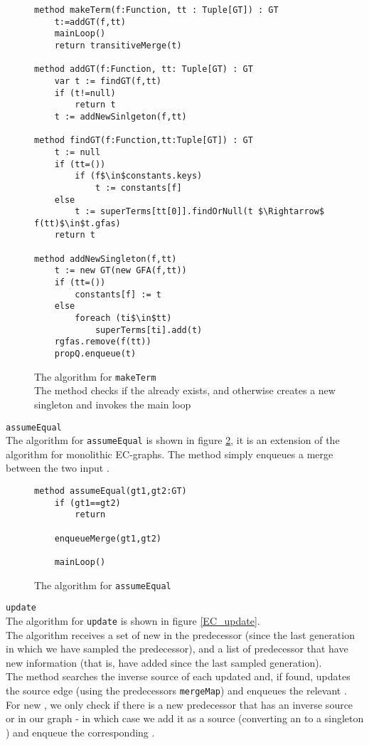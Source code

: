 \begin{figure}
\begin{lstlisting}
method makeTerm(f:Function, tt : Tuple[GT]) : GT
	t:=addGT(f,tt)
	mainLoop()
	return transitiveMerge(t)
	
method addGT(f:Function, tt: Tuple[GT) : GT
	var t := findGT(f,tt)
	if (t!=null)
		return t
	t := addNewSinlgeton(f,tt)

method findGT(f:Function,tt:Tuple[GT]) : GT
	t := null
	if (tt=())
		if (f$\in$constants.keys)
			t := constants[f]
	else
		t := superTerms[tt[0]].findOrNull(t $\Rightarrow$ f(tt)$\in$t.gfas)
	return t
	
method addNewSingleton(f,tt)
	t := new GT(new GFA(f,tt))
	if (tt=())
		constants[f] := t
	else
		foreach (ti$\in$tt)
			superTerms[ti].add(t)
	rgfas.remove(f(tt))
	propQ.enqueue(t)
\end{lstlisting}
\caption{The algorithm for \lstinline|makeTerm|\\
The method checks if the \GFA{} already exists, 
and otherwise creates a new singleton \GT{} and invokes the main loop
}
\label{EC_makeTerm}
\end{figure}

\bigskip
\noindent
\lstinline|assumeEqual|\\
The algorithm for  \lstinline|assumeEqual| is shown in figure \ref{EC_assumeEqual}, it is an extension of the algorithm for monolithic EC-graphs. The method simply enqueues a merge between the two input \GTs{}.

\begin{figure}
\begin{lstlisting}
method assumeEqual(gt1,gt2:GT)
	if (gt1==gt2)
		return
		
	enqueueMerge(gt1,gt2)
	
	mainLoop()
\end{lstlisting}
\caption{The algorithm for \lstinline|assumeEqual|\\
}
\label{EC_assumeEqual}
\end{figure}

\bigskip

\noindent
\lstinline|update|\\
The algorithm for \lstinline|update| is shown in figure \ref{EC_update}.\\
The algorithm receives a set of new \GTs{} in the predecessor (since the last generation in which we have sampled the predecessor), and a list of predecessor \GTs{} that have new information (that is, have added \GFAs{} since the last sampled generation).\\
The method searches the inverse source of each updated \GT{} and, if found, updates the source edge (using the predecessors \lstinline|mergeMap|) and enqueues the relevant \GT{}.\\
For new \GTs{}, we only check if there is a new predecessor \GT{} that has an inverse source \GFA{} or \RGFA{} in our graph - in which case we add it as a source (converting an \RGFA{} to a singleton \GT{}) and enqueue the corresponding \GT{}.

